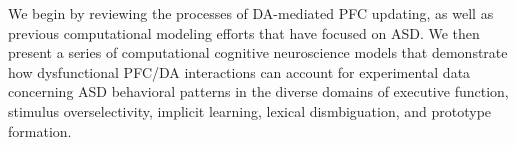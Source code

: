 
We begin by reviewing the processes of DA-mediated PFC updating, as well as previous computational modeling efforts that have focused on ASD. We then present a series of computational cognitive neuroscience models that demonstrate how dysfunctional PFC/DA interactions can account for experimental data concerning ASD behavioral patterns in the diverse domains of executive function, stimulus overselectivity, implicit learning, lexical dismbiguation, and prototype formation.
